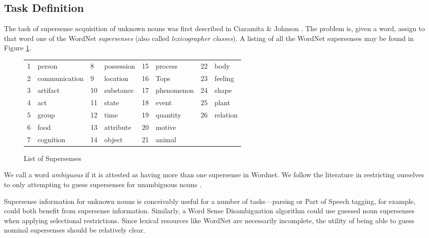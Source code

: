 \documentclass{article}
\begin{document}
\subsection{Task Definition}


The task of supersense acquisition of unknown nouns was first described in Ciaramita \& Johnson \cite{cj}.
The problem is, given a word,  assign to that word one of the WordNet {\it supersenses} (also called {\it lexicographer classes}).
A listing of all the WordNet supersenses may be found in Figure \ref{fig:supersenses}.
\begin{center}
\begin{figure}[htbp]
\begin{tabular}{llllllll}
1& person & 8& possession&  15& process&  22& body \\
2& communication & 9& location& 16& Tops&  23& feeling \\
3& artifact & 10& substance&  17& phenomenon& 24& shape \\
4& act & 11& state& 18& event&  25& plant \\
5& group & 12& time& 19& quantity&  26& relation \\
6& food & 13&  attribute& 20& motive \\
7& cognition& 14& object& 21& animal \\
\end{tabular}
\caption{List of Supersenses}
\label{fig:supersenses}
\end{figure}
\end{center}

We call a word {\it ambiguous} if it is attested as having more than one supersense in Wordnet.
We follow the literature in restricting ourselves to only attempting to guess supersenses for unambiguous nouns \cite{cj}\cite{curran}.

Supersense information for unknown nouns is conceivably useful for a number of tasks---parsing or Part of Speech tagging, for example, could both benefit from supersense information.
Similarly, a Word Sense Disambiguation algorithm could use guessed noun supersenses when applying selectional restrictions.
Since lexical resources like WordNet are necessarily incomplete, the utility of being able to guess nominal supersenses should be relatively clear.
\end{document}
